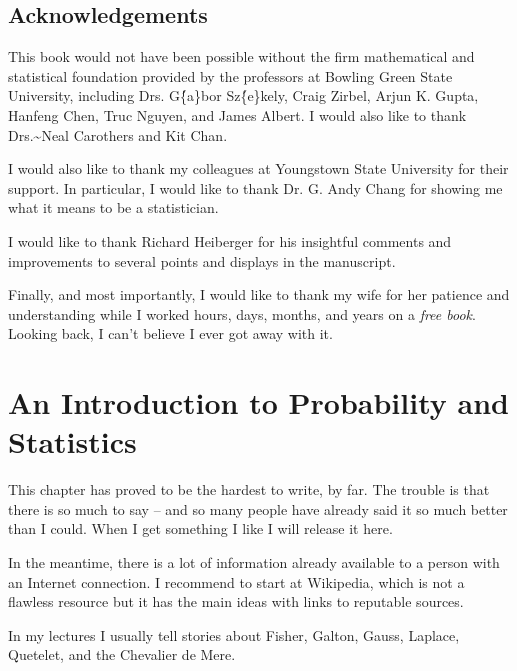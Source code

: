 \documentclass[captions=tableheading]{scrbook}
\begin{document}
\section*{Acknowledgements}

This book would not have been possible without the firm mathematical and statistical foundation provided by the professors at Bowling Green State University, including Drs. G\'\{a\}bor Sz\'\{e\}kely, Craig Zirbel, Arjun K. Gupta, Hanfeng Chen, Truc Nguyen, and James Albert. I would also like to thank Drs.\~{}Neal Carothers and Kit Chan. 

I would also like to thank my colleagues at Youngstown State University for their support. In particular, I would like to thank Dr. G. Andy Chang for showing me what it means to be a statistician.

I would like to thank Richard Heiberger for his insightful comments and improvements to several points and displays in the manuscript. 

Finally, and most importantly, I would like to thank my wife for her patience and understanding while I worked hours, days, months, and years on a \emph{free book}. Looking back, I can't believe I ever got away with it.

\vfill{}
\cleardoublepage
{}
{}
\listoffigures

\vfill{}
\cleardoublepage
{}
{}
\listoftables



\chapter{An Introduction to Probability and Statistics}
\label{sec-1}


\noindent This chapter has proved to be the hardest to write, by far. The trouble is that there is so much to say -- and so many people have already said it so much better than I could. When I get something I like I will release it here.

In the meantime, there is a lot of information already available to a person with an Internet connection. I recommend to start at Wikipedia, which is not a flawless resource but it has the main ideas with links to reputable sources.

In my lectures I usually tell stories about Fisher, Galton, Gauss, Laplace, Quetelet, and the Chevalier de Mere.
\end{document}
